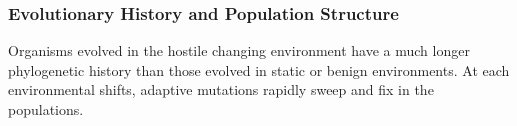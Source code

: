 \subsubsection{Evolutionary History and Population Structure}

Organisms evolved in the hostile changing environment have a much longer phylogenetic history than those evolved in static or benign environments. At each environmental shifts, adaptive mutations rapidly sweep and fix in the populations.






